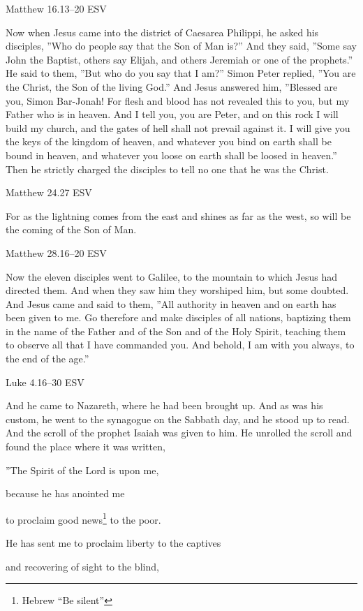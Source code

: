 \documentclass[
]{article}
\newcommand{\RL}[1]{\beginR #1\endR}
\begin{document}
Matthew 16.13--20 ESV

Now when Jesus came into the district of Caesarea Philippi, he asked his
disciples, \RL{''}Who do people say that the Son of Man is?'' And they
said, \RL{''}Some say John the Baptist, others say Elijah, and others
Jeremiah or one of the prophets.'' He said to them, \RL{''}But who do
you say that I am?'' Simon Peter replied, \RL{''}You are the Christ, the
Son of the living God.'' And Jesus answered him, \RL{''}Blessed are you,
Simon Bar-Jonah! For flesh and blood has not revealed this to you, but
my Father who is in heaven. And I tell you, you are Peter, and on this
rock I will build my church, and the gates of hell shall not prevail
against it. I will give you the keys of the kingdom of heaven, and
whatever you bind on earth shall be bound in heaven, and whatever you
loose on earth shall be loosed in heaven.'' Then he strictly charged the
disciples to tell no one that he was the Christ.

Matthew 24.27 ESV

For as the lightning comes from the east and shines as far as the west,
so will be the coming of the Son of Man.

Matthew 28.16--20 ESV

Now the eleven disciples went to Galilee, to the mountain to which Jesus
had directed them. And when they saw him they worshiped him, but some
doubted. And Jesus came and said to them, \RL{''}All authority in heaven
and on earth has been given to me. Go therefore and make disciples of
all nations, baptizing them in the name of the Father and of the Son and
of the Holy Spirit, teaching them to observe all that I have commanded
you. And behold, I am with you always, to the end of the age.''

Luke 4.16--30 ESV

And he came to Nazareth, where he had been brought up. And as was his
custom, he went to the synagogue on the Sabbath day, and he stood up to
read. And the scroll of the prophet Isaiah was given to him. He unrolled
the scroll and found the place where it was written,

\RL{''}The Spirit of the Lord is upon me,

because he has anointed me

to proclaim good news\footnote{Hebrew ``Be silent''} to the poor.

He has sent me to proclaim liberty to the captives

and recovering of sight to the blind,
\end{document}
